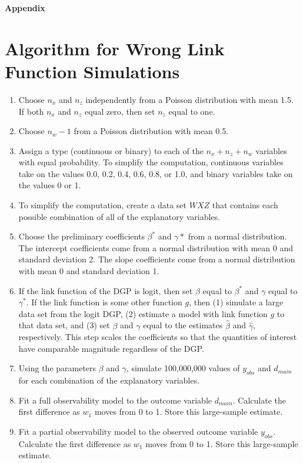 \documentclass[10pt]{article}
\begin{document}
\newpage
\begin{appendix}
\begin{center}
{\LARGE \textbf{Appendix}}
\end{center}
\section{Algorithm for Wrong Link Function Simulations}\label{app:link}

\begin{enumerate}
\item Choose $n_x$ and $n_z$ independently from a Poisson distribution with mean 1.5. If both $n_x$ and $n_z$ equal zero, then set $n_z$ equal to one.
\item Choose $n_w - 1$ from a Poisson distribution with mean 0.5.
\item Assign a type (continuous or binary) to each of the $n_x + n_z + n_w$ variables with equal probability. To simplify the computation, continuous variables take on the values 0.0, 0.2, 0.4, 0.6, 0.8, or 1.0, and binary variables take on the values 0 or 1.
\item To simplify the computation, create a data set $WXZ$ that contains each possible combination of all of the explanatory variables.
\item Choose the preliminary coefficients $\beta^*$ and $\gamma*$ from a normal distribution. The intercept coefficients come from a normal distribution with mean 0 and standard deviation 2. The slope coefficients come from a normal distribution with mean 0 and standard deviation 1.
\item If the link function of the DGP is logit, then set $\beta$ equal to $\beta^*$ and $\gamma$ equal to $\gamma^*$. If the link function is some other function $g$, then (1) simulate a large data set from the logit DGP, (2) estimate a model with link function $g$ to that data set, and (3) set $\beta$ and $\gamma$ equal to the estimates $\hat{\beta}$ and $\hat{\gamma}$, respectively. This step scales the coefficients so that the quantities of interest have comparable magnitude regardless of the DGP.
\item Using the parameters $\beta$ and $\gamma$, simulate 100,000,000 values of $y_{obs}$ and $d_{main}$ for each combination of the explanatory variables.
\item Fit a full observability model to the outcome variable $d_{main}$. Calculate the first difference as $w_1$ moves from 0 to 1. Store this large-sample estimate.
\item Fit a partial observability model to the observed outcome variable $y_{obs}$. Calculate the first difference as $w_1$ moves from 0 to 1. Store this large-sample estimate.
\end{enumerate}


\end{appendix}
\end{document}
